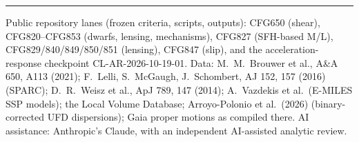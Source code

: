 \documentclass[10pt]{article}
\begin{document}
\vspace{4pt}\hrule\vspace{3pt}
{\footnotesize
Public repository lanes (frozen criteria, scripts, outputs): CFG650 (shear), CFG820--CFG853 (dwarfs, lensing, mechanisms), CFG827 (SFH-based M/L), CFG829/840/849/850/851 (lensing), CFG847 (slip), and the acceleration-response checkpoint CL-AR-2026-10-19-01.
Data: M.~M.~Brouwer et al., A\&A 650, A113 (2021); F.~Lelli, S.~McGaugh, J.~Schombert, AJ 152, 157 (2016) (SPARC); D.~R.~Weisz et al., ApJ 789, 147 (2014); A.~Vazdekis et al.\ (E-MILES SSP models); the Local Volume Database; Arroyo-Polonio et al.\ (2026) (binary-corrected UFD dispersions); Gaia proper motions as compiled there.
AI assistance: Anthropic's Claude, with an independent AI-assisted analytic review.}
\end{document}
